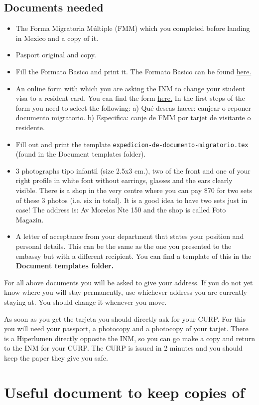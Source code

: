 \documentclass{article}
\begin{document}
\subsection{Documents needed}

\begin{itemize}
\item The Forma Migratoria Múltiple (FMM) which you completed before landing in Mexico and a copy of it. 
\item Pasport original and copy. 
\item Fill the Formato Basico and print it. The Formato Basico can be found \href{http://www.inm.gob.mx/complementos/FORMATO/Formato_Basico.pdf}{here.}
\item An online form with which you are asking the INM to change your student visa to a resident card. You can find the form \href{https://www.inm.gob.mx/tramites/publico/estancia.html}{here.} In the first steps of the form you need to select the following: 
 a) Qué deseas hacer: canjear o reponer documento migratorio. b) Especifica: canje de FMM por tarjet de visitante o residente.  
\item Fill out and print the template \texttt{expedicion-de-documento-migratorio.tex} (found in the Document templates folder).
\item 3 photographs tipo infantil (size 2.5x3 cm.), two of the front and one of your right profile in white font without earrings, glasses and the ears clearly visible. There is a shop in the very centre where you can pay \$70 for two sets of these 3 photos (i.e. six in total). It is a good idea to have two sets just in case! The address is: Av Morelos Nte 150 and the shop is called Foto Magazin.
\item A letter of acceptance from your department that states your position and personal details. This can be the same as the one you presented to the embassy but with a different recipient. You can find a template of this in the \textbf{Document templates folder.}
\end{itemize}

For all above documents you will be asked to give your address. If you do not yet know where you will stay permanently, use whichever address you are currently staying at.  You should change it whenever you move.

As soon as you get the tarjeta you should directly ask for your CURP. For this you will need your passport, a photocopy and a photocopy of your tarjet. There is a Hiperlumen directly opposite the INM, so you can go make a copy and return to the INM for your CURP. The CURP is issued in 2 minutes and you should keep the paper they give you safe. 

\section{Useful document to keep copies of}
\end{document}
